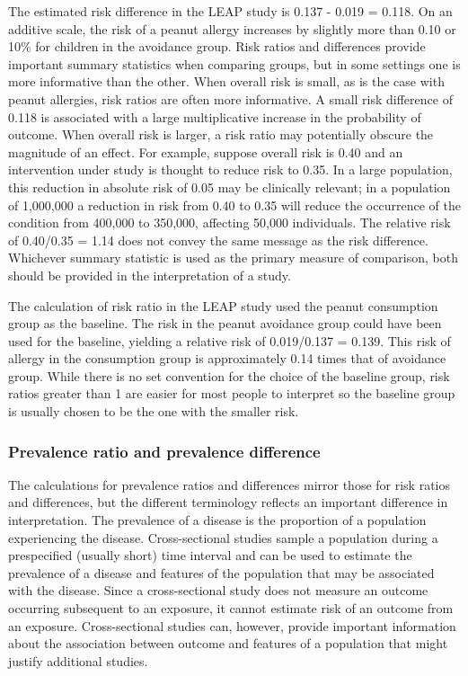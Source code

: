 The estimated risk difference in the LEAP study is 0.137 - 0.019 = 0.118.  On an additive scale, the risk of a peanut allergy increases by slightly more than 0.10 or 10\% for children in the avoidance group.  Risk ratios and differences provide important summary statistics when comparing groups, but in some settings one is more informative than the other.  When overall risk is small, as is the case with peanut allergies, risk ratios are often more informative.  A small risk difference of 0.118 is associated with a large multiplicative increase in the probability of outcome. When overall risk is larger, a risk ratio may potentially obscure the magnitude of an effect. For example, suppose overall risk is 0.40 and an intervention under study is thought to reduce risk to 0.35. In a large population, this reduction in absolute risk of 0.05 may be clinically relevant; in a population of 1,000,000 a reduction in risk from 0.40 to 0.35 will reduce the occurrence of the condition from 400,000 to 350,000, affecting 50,000 individuals. The relative risk of 0.40/0.35 = 1.14 does not convey the same message as the risk difference. Whichever summary statistic is used as the primary measure of comparison, both should be provided in the interpretation of a study.

The calculation of risk ratio in the LEAP study used the peanut consumption group as the baseline.  The risk in the peanut avoidance group could have been used for the baseline, yielding a relative risk of 0.019/0.137 = 0.139.  This risk of allergy in the consumption group is approximately 0.14 times that of avoidance group.  While there is no set convention for the choice of the baseline group, risk ratios greater than 1 are easier for most people to interpret so the baseline group is usually chosen to be the one with the smaller risk.

\subsubsection{Prevalence ratio and prevalence difference}

The calculations for prevalence ratios and differences mirror those for risk ratios and differences, but the different terminology reflects an important difference in interpretation.  The prevalence of a disease is the proportion of a population experiencing the disease.  Cross-sectional studies sample a population during a prespecified (usually short) time interval and can be used to estimate the prevalence of a disease and features of the population that may be associated with the disease. Since a cross-sectional study does not measure an outcome occurring subsequent to an exposure, it cannot estimate risk of an outcome from an exposure.  Cross-sectional studies can, however, provide important information about the association between outcome and features of a population that might justify additional studies.

